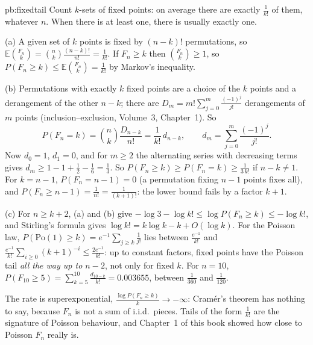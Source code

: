 \begin{solution}{pb:fixedtail}
\idea Count $k$-sets of fixed points: on average there are exactly $\frac1{k!}$ of them, whatever $n$. When there is at least one, there is usually exactly one.

\writeup (a) A given set of $k$ points is fixed by $(n-k)!$ permutations, so $\mathbb E\binom{F_n}k=\binom nk\frac{(n-k)!}{n!}=\frac1{k!}$. If $F_n\ge k$ then $\binom{F_n}k\ge1$, so
$P(F_n\ge k)\le\mathbb E\binom{F_n}k=\frac1{k!}$ by Markov's inequality.

(b) Permutations with exactly $k$ fixed points are a choice of the $k$ points and a derangement of the other $n-k$; there are $D_m=m!\sum_{j=0}^m\frac{(-1)^j}{j!}$ derangements
of $m$ points (inclusion--exclusion, Volume~3, Chapter~1). So
\[
P(F_n=k)=\binom nk\frac{D_{n-k}}{n!}=\frac1{k!}\,d_{n-k},\qquad d_m=\sum_{j=0}^m\frac{(-1)^j}{j!}.
\]
Now $d_0=1$, $d_1=0$, and for $m\ge2$ the alternating series with decreasing terms gives $d_m\ge1-1+\frac12-\frac16=\frac13$. So $P(F_n\ge k)\ge P(F_n=k)\ge\frac1{3\,k!}$ if
$n-k\ne1$. For $k=n-1$, $P(F_n=n-1)=0$ (a permutation fixing $n-1$ points fixes all), and $P(F_n\ge n-1)=\frac1{n!}=\frac1{(k+1)!}$: the lower bound fails by a factor $k+1$.

(c) For $n\ge k+2$, (a) and (b) give $-\log3-\log k!\le\log P(F_n\ge k)\le-\log k!$, and Stirling's formula gives $\log k!=k\log k-k+O(\log k)$. For the Poisson law,
$P(\mathrm{Po}(1)\ge k)=e^{-1}\sum_{j\ge k}\frac1{j!}$ lies between $\frac{e^{-1}}{k!}$ and $\frac{e^{-1}}{k!}\sum_{i\ge0}(k+1)^{-i}\le\frac{2e^{-1}}{k!}$: up to constant factors,
fixed points have the Poisson tail \emph{all the way up to $n-2$}, not only for fixed $k$. For $n=10$, $P(F_{10}\ge5)=\sum_{k=5}^{10}\frac{d_{10-k}}{k!}=0.003655$, between
$\frac1{360}$ and $\frac1{120}$.

\leads The rate is superexponential, $\frac{\log P(F_n\ge k)}k\to-\infty$: Cram\'er's theorem has nothing to say, because $F_n$ is not a sum of i.i.d.\ pieces. Tails of the
form $\frac1{k!}$ are the signature of Poisson behaviour, and Chapter~1 of this book showed how close to Poisson $F_n$ really is.
\end{solution}

